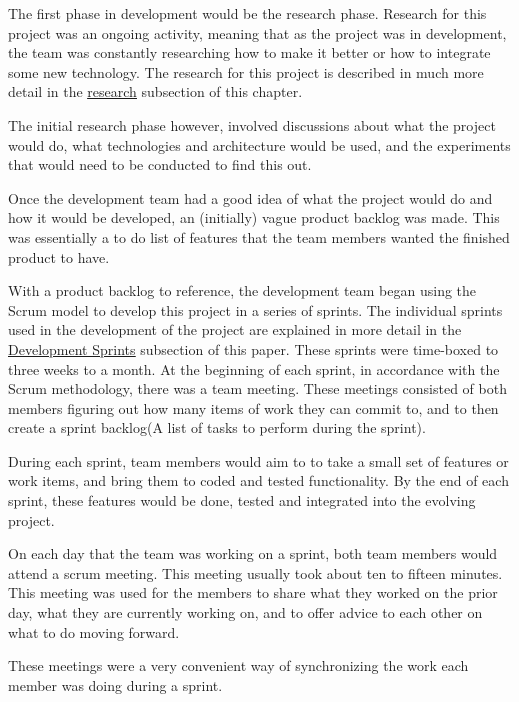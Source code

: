 The first phase in development would be the research phase. Research for this project was an ongoing activity, meaning that as the project was in development, the team was constantly researching how to make it better or how to integrate some new technology. The research for this project is described in much more detail in the \hyperref[sec:MethodologyResearch]{\underline{research}} subsection of this chapter. 

The initial research phase however, involved discussions about what the project would do, what technologies and architecture would be used, and the experiments that would need to be conducted to find this out.
\bigskip

Once the development team had a good idea of what the project would do and how it would be developed, an (initially) vague product backlog was made. This was essentially a to do list of features that the team members wanted the finished product to have.

\bigskip

With a product backlog to reference, the development team began using the Scrum\cite{schwaber1997scrum} model to develop this project in a series of sprints. The individual sprints used in the development of the project are explained in more detail in the \hyperref[sec:MethodologyDevelopmentSprints]{\underline{Development Sprints}} subsection of this paper.
These sprints were time-boxed to three weeks to a month. At the beginning of each sprint, in accordance with the Scrum methodology\cite{schwaber1997scrum}, there was a team meeting. These meetings consisted of both members figuring out how many items of work they can commit to, and to then create a sprint backlog(A list of tasks to perform during the sprint).
\bigskip

During each sprint, team members would aim to to take a small set of features or work items, and bring them to coded and tested functionality. By the end of each sprint, these features would be done, tested and integrated into the evolving project. 
\bigskip

On each day that the team was working on a sprint, both team members would attend a scrum meeting. This meeting usually took about ten to fifteen minutes. This meeting was used for the members to share what they worked on the prior day, what they are currently working on, and to offer advice to each other on what to do moving forward.

These meetings were a very convenient way of synchronizing the work each member was doing during a sprint.

